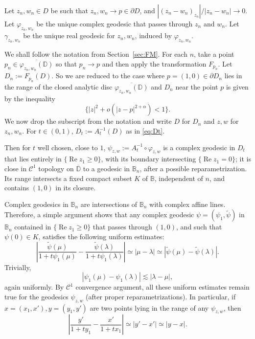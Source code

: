 \documentclass[a4paper,12pt]{amsart}
\newcommand\DD{{\mathbb D}}
\newcommand\BB{{\mathbb B}}
\def\re{\operatorname{Re}}
\theoremstyle{remark}\newtheorem{remark}[theorem]{Remark}
\begin{document}
Let $z_n,w_n\in D$ be such that $z_n,w_n\to p\in \partial D$, and $|(z_n-w_n)_{z_n}|/|z_n-w_n|\to 0$. Let $\varphi_{z_n,w_n}$ be the unique complex geodesic that passes through $z_n$ and $w_n$. Let $\gamma_{z_n,w_n}$ be the unique real geodesic for $z_n,w_n$, induced by $\varphi_{z_n,w_n}$.


We shall follow the notation from Section~\ref{sec:FM}. 
For each $n$, take a point $p_n \in \overline{\varphi_{z_n,w_n}(\DD)}$ so that $p_n\to p$ and then apply the transformation $F_{p_n}$. Let $D_n:=F_{p_n}(D)$.
So we are reduced to the case where
$p=(1,0)\in \partial D_n$ lies in the range of the closed analytic disc $\overline{\varphi_{z_n,w_n}(\DD)}$ and $D_n$ near the point $p$ is given by the inequality
\begin{equation}\label{eq:D}
\{|z|^2 + o(|z-p|^{2+\alpha})<1\}.
\end{equation}
We now drop the subscript from the notation and write $D$ for $D_n$
and $z,w$ for $z_n,w_n$.  For $t\in (0,1)$, $D_t:=A_t^{-1}(D)$ as in \eqref{eq:Dt}.

Then for $t$ well chosen, 
close to $1$, $\psi_{z,w}:=A_t^{-1}\circ \varphi_{z,w}$ is a complex geodesic in $D_t$ that lies entirely in $\{\re z_1\geq 0\}$, with its boundary intersecting $\{\re z_1 =0\}$;  it is close in $\mathcal C^{1}$ topology on $\overline \DD$ to a geodesic in $\BB_n$, after a possible reparametrization. Its range intersects a fixed compact subset $K$ of $\mathbb B$, independent of $n$, and contains $(1,0)$ in its closure.

Complex geodesics in $\mathbb B_n$  are intersections of $\mathbb B_n$ with complex affine lines. Therefore, a simple argument shows that any
complex 
geodesic $\psi=(\psi_1, \tilde \psi)$ in $\mathbb B_n$ contained in $\{ \re z_1\geq 0\}$
that passes through $(1,0)$, and such that $\psi(0)\in K$, satisfies the following uniform estimates:
$$
\left| \frac{\tilde \psi(\mu)}{1+ t \psi_1(\mu)} - \frac{\tilde \psi (\lambda)}{1 + t \psi_1(\lambda)} \right| 
\simeq |\mu - \lambda|\simeq |\tilde \psi(\mu) - \tilde \psi(\lambda)|.
$$ 
Trivially, 
$$|\psi_1(\mu) - \psi_1(\lambda) |\lesssim |\lambda - \mu|,$$ again uniformly.
By $\mathcal C^1$ convergence argument, all these uniform estimates remain true for the geodesics $\psi_{z,w}$ (after proper reparametrizations). In particular, if $x=(x_1, x'), y=(y_1,  y')$ are two points lying in the range
of any $\psi_{z,w}$, then 
\begin{equation}\label{eq:xy} \left| \frac{y'}{1+ t y_1} - \frac{x'}{1+ tx_1}\right| \simeq |y' - x'| \simeq |y- x|.
\end{equation}
\end{document}
